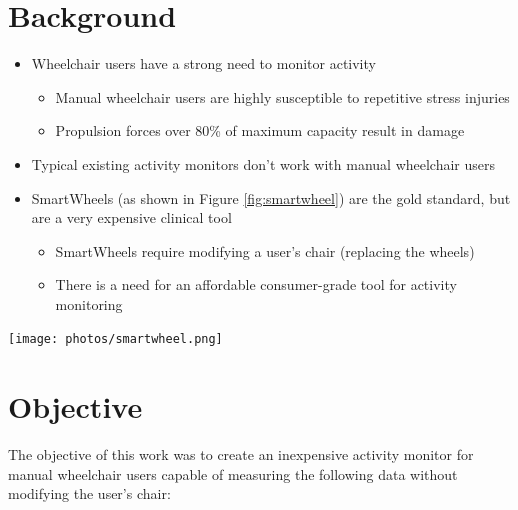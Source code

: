 \documentclass[a0,landscape]{a0poster}
\newenvironment{Figure}
  {\par\medskip\noindent\minipage{\linewidth}}
  {\endminipage\par\medskip}
\begin{document}
\vspace{4cm}

\begin{multicols*}{3}
\large

\section*{Background}
\begin{itemize}
    \item Wheelchair users have a strong need to monitor activity
        \begin{itemize}
            \item Manual wheelchair users are highly susceptible to repetitive stress injuries %
            \item Propulsion forces over 80\% of maximum capacity result in damage %
        \end{itemize}
    \item Typical existing activity monitors don't work with manual wheelchair users
    \item SmartWheels (as shown in Figure \ref{fig:smartwheel}) are the gold standard, but are a very expensive clinical tool \cite{asato93}
        \begin{itemize}
            \item SmartWheels require modifying a user's chair (replacing the wheels)
            \item There is a need for an affordable consumer-grade tool for activity monitoring
        \end{itemize}
\end{itemize}

\begin{Figure}
    \centering
    \texttt{[image: photos/smartwheel.png]}
    \label{fig:smartwheel}
\end{Figure}

\section*{Objective}
The objective of this work was to create an inexpensive activity monitor for manual wheelchair users capable of measuring the following data without modifying the user's chair:


\end{multicols*}
\end{document}
